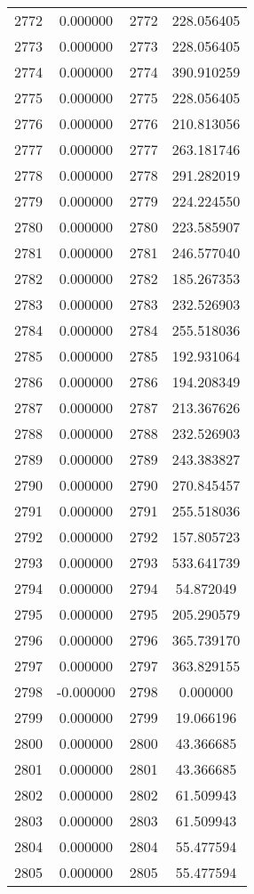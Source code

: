 \documentclass[12pt]{article}
\begin{document}
\begin{longtable}{@{}cccc@{}}
2772 & 0.000000 & 2772 & 228.056405 \\
2773 & 0.000000 & 2773 & 228.056405 \\
2774 & 0.000000 & 2774 & 390.910259 \\
2775 & 0.000000 & 2775 & 228.056405 \\
2776 & 0.000000 & 2776 & 210.813056 \\
2777 & 0.000000 & 2777 & 263.181746 \\
2778 & 0.000000 & 2778 & 291.282019 \\
2779 & 0.000000 & 2779 & 224.224550 \\
2780 & 0.000000 & 2780 & 223.585907 \\
2781 & 0.000000 & 2781 & 246.577040 \\
2782 & 0.000000 & 2782 & 185.267353 \\
2783 & 0.000000 & 2783 & 232.526903 \\
2784 & 0.000000 & 2784 & 255.518036 \\
2785 & 0.000000 & 2785 & 192.931064 \\
2786 & 0.000000 & 2786 & 194.208349 \\
2787 & 0.000000 & 2787 & 213.367626 \\
2788 & 0.000000 & 2788 & 232.526903 \\
2789 & 0.000000 & 2789 & 243.383827 \\
2790 & 0.000000 & 2790 & 270.845457 \\
2791 & 0.000000 & 2791 & 255.518036 \\
2792 & 0.000000 & 2792 & 157.805723 \\
2793 & 0.000000 & 2793 & 533.641739 \\
2794 & 0.000000 & 2794 & 54.872049 \\
2795 & 0.000000 & 2795 & 205.290579 \\
2796 & 0.000000 & 2796 & 365.739170 \\
2797 & 0.000000 & 2797 & 363.829155 \\
2798 & -0.000000 & 2798 & 0.000000 \\
2799 & 0.000000 & 2799 & 19.066196 \\
2800 & 0.000000 & 2800 & 43.366685 \\
2801 & 0.000000 & 2801 & 43.366685 \\
2802 & 0.000000 & 2802 & 61.509943 \\
2803 & 0.000000 & 2803 & 61.509943 \\
2804 & 0.000000 & 2804 & 55.477594 \\
2805 & 0.000000 & 2805 & 55.477594 \\

\end{longtable}
\end{document}
